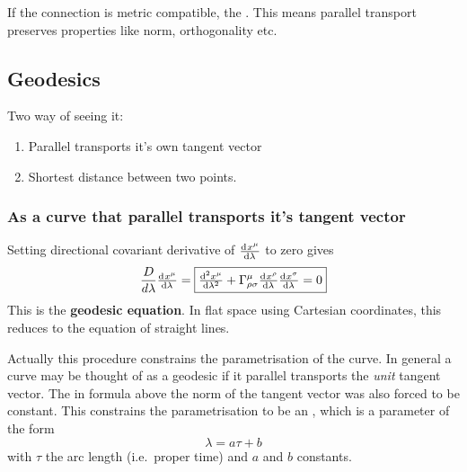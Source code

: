 

If the connection is metric compatible, the . This means parallel transport preserves properties like norm, orthogonality etc.

\subsection{Geodesics}
Two way of seeing it:
\begin{enumerate}
\item Parallel transports it's own tangent vector
\item Shortest distance between two points.
\end{enumerate}

\subsubsection{As a curve that parallel transports it's tangent vector}
Setting directional covariant derivative of $\od{x^\mu}{\lambda}$ to zero gives
\[ \frac{D}{d\lambda}\od{x^\mu}{\lambda} = \boxed{ \od[2]{x^\mu}{\lambda} + \Gamma^\mu_{\rho\sigma}\od{x^\rho}{\lambda}\od{x^\sigma}{\lambda} = 0 } \]
This is the \textbf{geodesic equation}. In flat space using Cartesian coordinates, this reduces to the equation of straight lines.

Actually this procedure constrains the parametrisation of the curve. In general a curve may be thought of as a geodesic if it parallel transports the \emph{unit} tangent vector. The in formula above the norm of the tangent vector was also forced to be constant. This constrains the parametrisation to be an , which is a parameter of the form
\[ \lambda = a\tau + b \]
with $\tau$ the arc length (i.e.\ proper time) and $a$ and $b$ constants.

